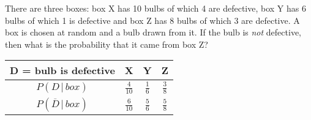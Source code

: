 
%
%
%
%
% 
% 

\question[3] There are three boxes: box X has 10 bulbs of which 4 are defective, 
box Y has 6 bulbs of which 1 is defective and box Z has 8 bulbs of which 3 are defective. 
A box is chosen at random and a bulb drawn from it. If the bulb is \textit{not} defective,
then what is the probability that it came from box Z?


\ifprintanswers
  \begin{table}[ht]
    \begin{tabular}{cccc}
      \toprule
      D = bulb is defective & X & Y & Z \\
      \midrule
      $P(D\,\vert\, box)$ & $\frac{4}{10}$ & $\frac{1}{6}$ & $\frac{3}{8}$ \\
      $P(\overline{D}\,\vert\, box)$ & $\frac{6}{10}$ & $\frac{5}{6}$ & $\frac{5}{8}$ \\
      \bottomrule
    \end{tabular}
  \end{table}
\fi 

